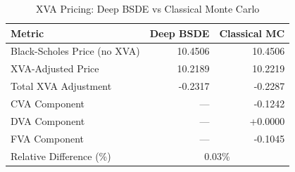\begin{table}[htbp]
\centering
\caption{XVA Pricing: Deep BSDE vs Classical Monte Carlo}
\label{tab:xva_results}
\begin{tabular}{@{}lrr@{}}
\toprule
\textbf{Metric} & \textbf{Deep BSDE} & \textbf{Classical MC} \\
\midrule
Black-Scholes Price (no XVA) & 10.4506 & 10.4506 \\
XVA-Adjusted Price & 10.2189 & 10.2219 \\
Total XVA Adjustment & -0.2317 & -0.2287 \\
\midrule
CVA Component & --- & -0.1242 \\
DVA Component & --- & +0.0000 \\
FVA Component & --- & -0.1045 \\
\midrule
Relative Difference (\%) & \multicolumn{2}{c}{0.03\%} \\
\bottomrule
\end{tabular}
\end{table}

